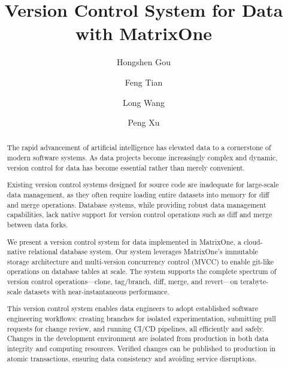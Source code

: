 \documentclass[sigconf,nonacm]{acmart} %
\begin{document}
\title{Version Control System for Data with MatrixOne}

\author{Hongshen Gou}

\author{Feng Tian}

\author{Long Wang}

\author{Peng Xu}

\begin{abstract}
The rapid advancement of artificial intelligence has elevated data to a cornerstone 
of modern software systems. As data projects become increasingly complex and dynamic, 
version control for data has become essential rather than merely convenient. 

Existing version control systems designed for source code are inadequate for large-scale 
data management, as they often require loading entire datasets into memory for diff and merge 
operations. Database systems, while providing robust data management capabilities, lack 
native support for version control operations such as diff and merge between data forks.

We present a version control system for data implemented in MatrixOne, 
a cloud-native relational database system. Our system leverages MatrixOne's 
immutable storage architecture and multi-version concurrency control (MVCC) to enable 
git-like operations on database tables at scale. The system supports the complete 
spectrum of version control operations—clone, tag/branch, diff, merge, and revert—on 
terabyte-scale datasets with near-instantaneous performance. 

This version control system enables data engineers to adopt established software engineering 
workflows: creating branches for isolated experimentation, submitting pull requests for 
change review, and running CI/CD pipelines, all efficiently and safely. Changes in the 
development environment are isolated from production in both data integrity and computing 
resources. Verified changes can be published to production in atomic transactions, 
ensuring data consistency and avoiding service disruptions.
\end{abstract}
\end{document}
